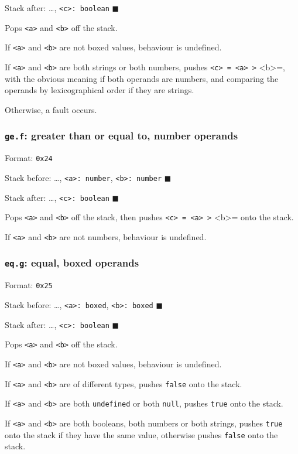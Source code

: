 Stack after: \ldots{}, \texttt{<c>: boolean} \(\blacksquare\)

Pops \texttt{<a>} and \texttt{<b>} off the stack.

If \texttt{<a>} and \texttt{<b>} are not boxed values, behaviour is undefined.

If \texttt{<a>} and \texttt{<b>} are both strings or both numbers, pushes
\texttt{<c> = <a> >} <b>=, with the obvious meaning if both operands are
numbers, and comparing the operands by lexicographical order if they are
strings.

Otherwise, a fault occurs.

\subsubsection{\texttt{ge.f}: greater than or equal to, number operands}
\label{sec:org24757e3}
Format: \texttt{0x24}

Stack before: \ldots{}, \texttt{<a>: number}, \texttt{<b>: number} \(\blacksquare\)

Stack after: \ldots{}, \texttt{<c>: boolean} \(\blacksquare\)

Pops \texttt{<a>} and \texttt{<b>} off the stack, then pushes \texttt{<c> = <a> >} <b>= onto
the stack.

If \texttt{<a>} and \texttt{<b>} are not numbers, behaviour is undefined.

\subsubsection{\texttt{eq.g}: equal, boxed operands}
\label{sec:orgb222de9}
Format: \texttt{0x25}

Stack before: \ldots{}, \texttt{<a>: boxed}, \texttt{<b>: boxed} \(\blacksquare\)

Stack after: \ldots{}, \texttt{<c>: boolean} \(\blacksquare\)

Pops \texttt{<a>} and \texttt{<b>} off the stack.

If \texttt{<a>} and \texttt{<b>} are not boxed values, behaviour is undefined.

If \texttt{<a>} and \texttt{<b>} are of different types, pushes \texttt{false} onto the
stack.

If \texttt{<a>} and \texttt{<b>} are both \texttt{undefined} or both \texttt{null}, pushes \texttt{true}
onto the stack.

If \texttt{<a>} and \texttt{<b>} are both booleans, both numbers or both strings,
pushes \texttt{true} onto the stack if they have the same value, otherwise
pushes \texttt{false} onto the stack.

